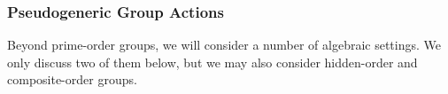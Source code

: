 {\begin{itemize}
\fi

 

\subsubsection{Pseudogeneric Group Actions}


\iffalse
Beyond prime-order groups, we will consider a number of algebraic settings.  We only discuss two of them below, but we may also consider hidden-order and composite-order groups.


\end{itemize}}
